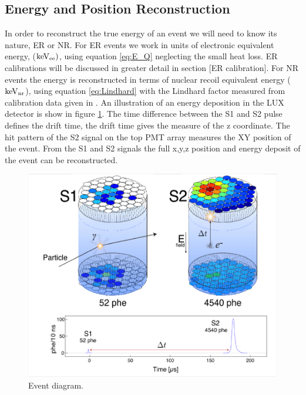\subsection{Energy and Position Reconstruction}
In order to reconstruct the true energy of an event we will need to know its nature, ER or NR. For ER events we work in units of electronic equivalent energy, ($\rm keV_{ee})$, using equation \ref{eq:E_Q} neglecting the small heat loss. ER calibrations will be discussed in greater detail in section [ER calibration]. For NR events the energy is reconstructed in terms of nuclear recoil equivalent energy ($\rm keV_{nr}$), using equation \ref{eq:Lindhard} with the Lindhard factor measured from calibration data given in \cite{NEST} \cite{NEST_2013}.  An illustration of an energy deposition in the LUX detector is show in figure \ref{fig:LUX_Event}. The time difference between the S1 and S2 pulse defines the drift time, the drift time gives the measure of the z coordinate. The hit pattern of the S2 signal on the top PMT array measures the XY position of the event. From the S1 and S2 signals the full x,y,z position and energy deposit of the event can be reconstructed.

 \begin{figure}[h!]\centering
\includegraphics[width=150mm]{Chapter_LUX_Det/LUX_Event_Diagram.png}
\caption{Event diagram.}
\label{fig:LUX_Event}
\end{figure}

